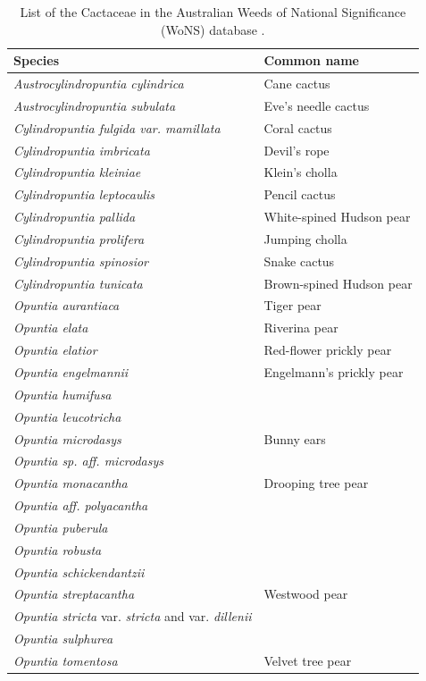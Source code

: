 \clearpage

\begin{table}[H]
\caption{List of the Cactaceae in the Australian Weeds of National Significance (WoNS) database \citep{managingOpuntioid2017}.} \label{tab:invasiveCactiAus} 
\renewcommand{\arraystretch}{0.5}
\centering
\begin{tabular}{@{}ll@{}}
\toprule
\textbf{Species} & \textbf{Common name} \\ \midrule
\textit{Austrocylindropuntia cylindrica} & Cane cactus \\
\textit{Austrocylindropuntia subulata} & Eve’s needle cactus \\
\textit{Cylindropuntia fulgida var. mamillata} & Coral cactus \\
\textit{Cylindropuntia imbricata} & Devil’s rope \\
\textit{Cylindropuntia kleiniae} & Klein's cholla \\
\textit{Cylindropuntia leptocaulis} & Pencil cactus \\
\textit{Cylindropuntia pallida} & White-spined Hudson pear \\
\textit{Cylindropuntia prolifera} & Jumping cholla \\
\textit{Cylindropuntia spinosior} & Snake cactus \\
\textit{Cylindropuntia tunicata} & Brown-spined Hudson pear \\
\textit{Opuntia aurantiaca} & Tiger pear \\
\textit{Opuntia elata} & Riverina pear \\
\textit{Opuntia elatior} & Red-flower prickly pear \\
\textit{Opuntia engelmannii} & Engelmann's prickly pear \\
\textit{Opuntia humifusa} &  \\
\textit{Opuntia leucotricha} &  \\
\textit{Opuntia microdasys} & Bunny ears \\
\textit{Opuntia sp. aff. microdasys} &  \\
\textit{Opuntia monacantha} & Drooping tree pear \\
\textit{Opuntia aff. polyacantha} &  \\
\textit{Opuntia puberula} &  \\
\textit{Opuntia robusta} &  \\
\textit{Opuntia schickendantzii} &  \\
\textit{Opuntia streptacantha} & Westwood pear \\
\textit{Opuntia stricta} var. \textit{stricta} and var. \textit{dillenii} &  \\
\textit{Opuntia sulphurea} &  \\
\textit{Opuntia tomentosa} & Velvet tree pear \\ \bottomrule
\end{tabular}
\end{table}

